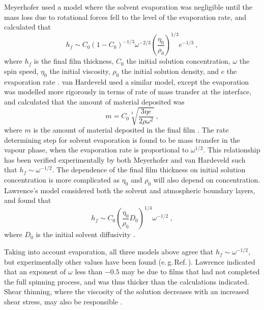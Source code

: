 Meyerhofer used a model where the solvent evaporation was negligible until the mass loss due to rotational forces fell to the level of the evaporation rate, and calculated that
\begin{equation}
h_f \sim C_0(1-C_0)^{-1/3} \omega^{-2/3} \left( \frac{\eta_0}{\rho_0} \right)^{1/3} e^{-1/3} ~,
\label{Meyehofer}
\end{equation}
where $h_f$ is the final film thickness, $C_0$ the initial solution concentration, $\omega$ the spin speed, $\eta_0$ the initial viscosity, $\rho_0$ the initial solution density, and $e$ the evaporation rate \cite{Meyerhofer1978}. van Hardeveld used a similar model, except the evaporation was modelled more rigorously in terms of rate of mass transfer at the interface, and calculated that the amount of material deposited was
\begin{equation}
m = C_0 \sqrt[3]{\frac{3 \eta e}{2 \rho {\omega}^2}} ~,
\label{Hardeveld}
\end{equation}
where $m$ is the amount of material deposited in the final film \cite{VanHardeveld1995}. The rate determining step for solvent evaporation is found to be mass transfer in the vapour phase, when the evaporation rate is proportional to ${\omega}^{1/2}$. This relationship has been verified experimentally by both Meyerhofer and van Hardeveld \cite{Meyerhofer1978, VanHardeveld1995} such that $h_f \sim \omega^{-1/2}$. The dependence of the final film thickness on initial solution concentration is more complicated as $\eta_0$ and $\rho_0$ will also depend on concentration. Lawrence's model considered both the solvent and atmospheric boundary layers, and found that
\begin{equation}
h_f \sim C_0 \left(\frac{\eta_0}{\rho_0} D_0 \right)^{1/4} \omega^{-1/2} ~,
\label{Lawrence}
\end{equation}
where $D_0$ is the initial solvent diffusivity \cite{Lawrence1988}.

Taking into account evaporation, all three models above agree that $h_f \sim \omega^{-1/2}$, but experimentally other values have been found (e.\,g.\,Ref.\,\cite{Lawrence1988}). Lawrence indicated that an exponent of $\omega$ less than $-0.5$ may be due to films that had not completed the full spinning process, and was thus thicker than the calculations indicated. Shear thinning, where the viscosity of the solution decreases with an increased shear stress, may also be responsible \cite{Lawrence1988}.

